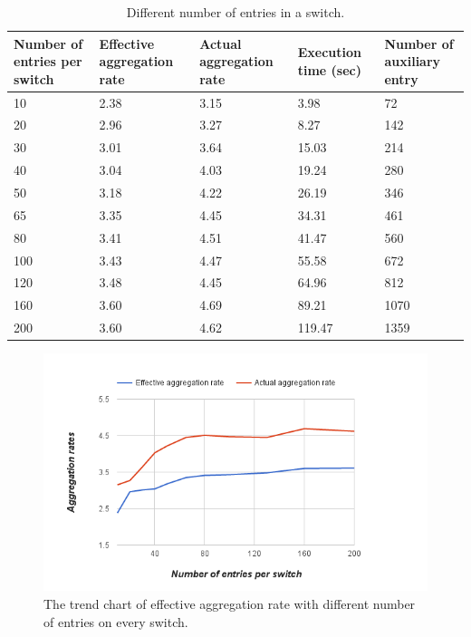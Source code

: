 \begin{table}
\centering
\caption{Different number of entries in a switch.}
\begin{tabular}{|l|p{2.6cm}|p{2.6cm}|p{1.9cm}|p{2.8cm}|}
\hline Number of entries per switch & Effective aggregation rate & Actual aggregation rate & Execution time (sec) & Number of auxiliary entry \\
\hline
\hline 10 & 2.38 & 3.15 & 3.98 & 72 \\
\hline 20 & 2.96 & 3.27 & 8.27 & 142 \\
\hline 30 & 3.01 & 3.64 & 15.03 & 214 \\
\hline 40 & 3.04 & 4.03 & 19.24 & 280 \\
\hline 50 & 3.18 & 4.22 & 26.19 & 346 \\
\hline 65 & 3.35 & 4.45 & 34.31 & 461 \\
\hline 80 & 3.41 & 4.51 & 41.47 & 560 \\
\hline 100 & 3.43 & 4.47 & 55.58 & 672 \\
\hline 120 & 3.48 & 4.45 & 64.96 & 812 \\
\hline 160 & 3.60 & 4.69 & 89.21 & 1070 \\
\hline 200 & 3.60 & 4.62 & 119.47 & 1359 \\
\hline 
\end{tabular}
\label{table:different_entry_per_switch}
\end{table}

\begin{figure}[H]
\begin{center} 
\includegraphics[width=1\textwidth]{figures/exp_entrynum_trend.png}
\end{center}
\caption{The trend chart of effective aggregation rate with different number of entries on every switch.}
\label{exp_entrynum_trend}
\end{figure}

